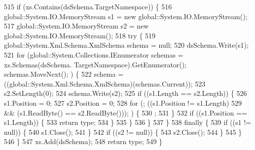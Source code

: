 \begin{DoxyCode}
515                 \textcolor{keywordflow}{if} (xs.Contains(dsSchema.TargetNamespace)) \{
516                     global::System.IO.MemoryStream s1 = \textcolor{keyword}{new} global::System.IO.MemoryStream();
517                     global::System.IO.MemoryStream s2 = \textcolor{keyword}{new} global::System.IO.MemoryStream();
518                     \textcolor{keywordflow}{try} \{
519                         global::System.Xml.Schema.XmlSchema schema = null;
520                         dsSchema.Write(s1);
521                         \textcolor{keywordflow}{for} (global::System.Collections.IEnumerator schemas = xs.Schemas(dsSchema.
      TargetNamespace).GetEnumerator(); schemas.MoveNext(); ) \{
522                             schema = ((global::System.Xml.Schema.XmlSchema)(schemas.Current));
523                             s2.SetLength(0);
524                             schema.Write(s2);
525                             \textcolor{keywordflow}{if} ((s1.Length == s2.Length)) \{
526                                 s1.Position = 0;
527                                 s2.Position = 0;
528                                 \textcolor{keywordflow}{for} (; ((s1.Position != s1.Length) 
529                                             && (s1.ReadByte() == s2.ReadByte())); ) \{
530                                     ;
531                                 \}
532                                 \textcolor{keywordflow}{if} ((s1.Position == s1.Length)) \{
533                                     \textcolor{keywordflow}{return} type;
534                                 \}
535                             \}
536                         \}
537                     \}
538                     \textcolor{keywordflow}{finally} \{
539                         \textcolor{keywordflow}{if} ((s1 != null)) \{
540                             s1.Close();
541                         \}
542                         \textcolor{keywordflow}{if} ((s2 != null)) \{
543                             s2.Close();
544                         \}
545                     \}
546                 \}
547                 xs.Add(dsSchema);
548                 \textcolor{keywordflow}{return} type;
549             \}
\end{DoxyCode}
